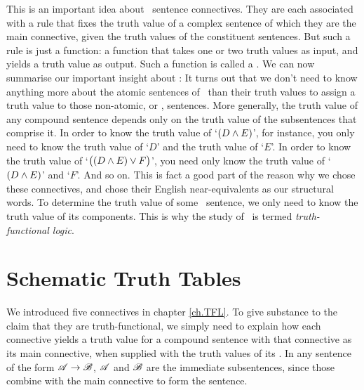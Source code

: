 This is an important idea about \TFL\ sentence connectives. They are each associated with a rule that fixes the truth value of a complex sentence of which they are the main connective, given the truth values of the constituent sentences. But such a rule is just a function: a function that takes one or two truth values as input, and yields a truth value as output. Such a function is called a . We can now summarise our important insight about \TFL: 
It turns out that we don't need to know anything more about the atomic sentences of \TFL\ than their truth values to assign a truth value to those non-atomic, or , sentences. More generally, the truth value of any compound sentence depends only on the truth value of the subsentences that comprise it. In order to know the truth value of `$(D \wedge E)$', for instance, you only need to know the truth value of `$D$' and the truth value of `$E$'. In order to know the truth value of `$\bigl( (D \wedge E) \vee F\bigr)$', you need only know the truth value of `$(D \wedge E)$' and `$F$'. And so on. This is fact a good part of the reason why we chose these connectives, and chose their English near-equivalents as our structural words. To determine the truth value of some \TFL\ sentence, we only need to know the truth value of its components. This is why the study of \TFL\ is termed \emph{truth-functional logic}.

\section{Schematic Truth Tables}\label{s:SchematicTruthTables}

We introduced five connectives in chapter \ref{ch.TFL}. To give substance to the claim that they are truth-functional, we simply need to explain how each connective yields a truth value for a compound sentence with that connective as its main connective, when supplied with the truth values of its . In any sentence of the form $\mathscr{A} \rightarrow \mathscr{B}$, $\mathscr{A}$ and $\mathscr{B}$ are the immediate subsentences, since those combine with the main connective to form the sentence.

